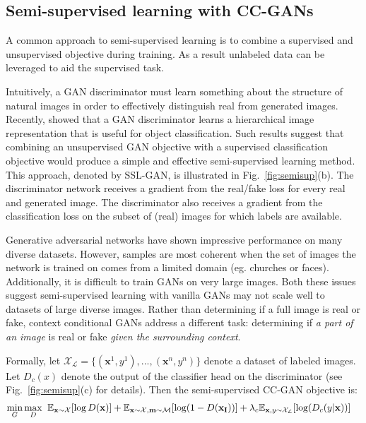 \documentclass{article} \usepackage{iclr2017_conference,times}
\newcommand{\fig}[1]{Fig.~\ref{fig:#1}}
\begin{document}
\subsection{Semi-supervised learning with CC-GANs}
A common approach to semi-supervised learning is to combine a supervised and unsupervised objective during training.
As a result unlabeled data can be leveraged to aid the supervised task.

Intuitively, a GAN discriminator must learn something about the structure of natural images in order to effectively distinguish real from generated images. 
Recently, \cite{radford2016} showed that a GAN discriminator learns a hierarchical image representation that is useful for object classification.  
Such results suggest that combining an unsupervised GAN objective with a supervised classification objective would produce a simple and effective semi-supervised learning method. 
This approach, denoted by SSL-GAN, is illustrated in \fig{semisup}(b). The discriminator network receives a gradient from the real/fake loss for every real and generated image.
The discriminator also receives a gradient from the classification loss on the subset of (real) images for which labels are available. 

Generative adversarial networks have shown impressive performance on many diverse datasets. However, samples are most coherent when the set of images the network is trained on comes from a limited domain (eg. churches or faces).
Additionally, it is difficult to train GANs on very large images.
Both these issues suggest semi-supervised learning with vanilla GANs may not scale well to datasets of large diverse images. 
Rather than determining if a full image is real or fake, context conditional GANs address a different task: determining if {\it a part of an image} is real or fake {\it given the surrounding context}.

Formally, let $\mathcal{X_L} = \{(\mathbf{x}^1, y^1), ..., (\mathbf{x}^n, y^n)\}$ denote a dataset of labeled images.
Let $D_c(x)$ denote the output of the classifier head on the discriminator (see \fig{semisup}(c) for details). 
Then the semi-supervised CC-GAN objective is: 
\begin{align}
\label{eqn:sslccgan}
\min_G \max_D \hspace{2mm} & \mathbb{E}_{\mathbf{x} \sim \mathcal{X}}[\log D(\mathbf{x})]  
+ \mathbb{E}_{\mathbf{x} \sim \mathcal{X}, \mathbf{m} \sim \mathcal{M}} [\log(1 - D(\mathbf{x_I}))]
+ \lambda_c  \mathbb{E}_{\mathbf{x},y \sim \mathcal{X_L}} [\log(D_c(y | \mathbf{x}))]
\end{align}
\end{document}
